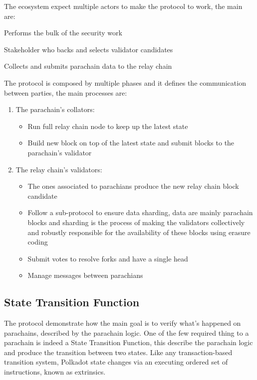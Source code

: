 The ecosystem expect multiple actors to make the protocol to work, the main are:
\begin{description}[font=$\bullet$ \scshape\bfseries]
  \item[Validator] Performs the bulk of the security work
  \item[Nonimator] Stakeholder who backs and selects validator candidates
  \item[Collator] Collects and submits parachain data to the relay chain
\end{description}

The protocol is composed by multiple phases and it defines the communication between parties, the main processes are:~\cite{burdges2020overview}

\begin{enumerate}
  \item The parachain's collators:
        \begin{itemize}
                \item Run full relay chain node to keep up the latest state
                \item Build new block on top of the latest state and submit blocks to the parachain's validator
        \end{itemize}
  \item The relay chain's validators:
    \begin{itemize}
      \item The ones associated to parachians produce the new relay chain block candidate
      \item Follow a sub-protocol to ensure data sharding, data are mainly parachain blocks and sharding is the process of making the validators collectively and robustly responsible for the availability of these blocks using erasure coding
      \item Submit votes to resolve forks and have a single head
      \item Manage messages between parachians
    \end{itemize}
\end{enumerate}

\subsection{State Transition Function}

The protocol demonstrate how the main goal is to verify what's happened on parachains, described by the parachain logic. One of the few required thing to a parachain is indeed a State Transition Function, this describe the parachain logic and produce the transition between two states. Like any transaction-based transition system, Polkadot state changes via an executing ordered set of instructions, known as extrinsics.~\cite{burdges2020overview}

